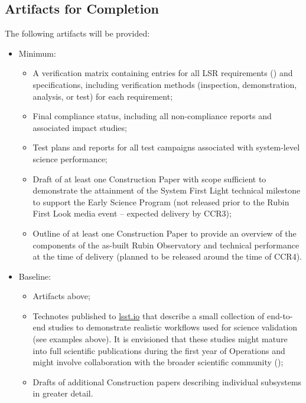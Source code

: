 \subsection{Artifacts for Completion}

The following artifacts will be provided:

\begin{itemize}

	\item Minimum:

		\begin{itemize}
			\item A verification matrix containing entries for all LSR requirements () and specifications, including verification methods (inspection, demonstration, analysis, or test) for each requirement;
			\item Final compliance status, including all non-compliance reports and associated impact studies;
			\item Test plans and reports for all test campaigns associated with system-level science performance;
			\item Draft of at least one Construction Paper with scope sufficient to demonstrate the attainment of the System First Light technical milestone to support the Early Science Program (not released prior to the Rubin First Look media event -- expected delivery by CCR3);
			\item Outline of at least one Construction Paper to provide an overview of the components of the as-built Rubin Observatory and technical performance at the time of delivery (planned to be released around the time of CCR4).

		\end{itemize}

	\item Baseline:

		\begin{itemize}

			\item Artifacts above;
			\item Technotes published to \url{lsst.io} that describe a small collection of end-to-end studies to demonstrate realistic workflows used for science validation (see examples above). It is envisioned that these studies might mature into full scientific publications during the first year of Operations and might involve collaboration with the broader scientific community ();
			\item Drafts of additional Construction papers describing individual subsystems in greater detail.

		\end{itemize}

\end{itemize}







